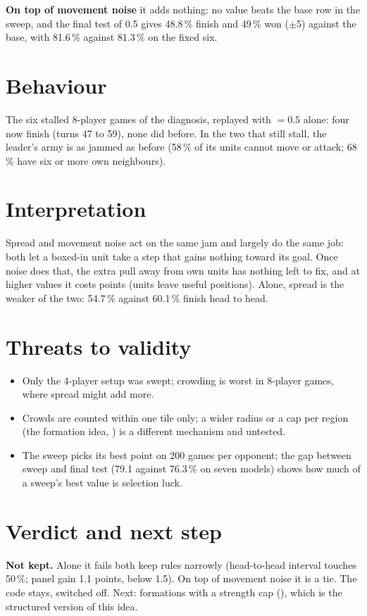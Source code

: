 \documentclass{../polyexp}
\begin{document}
\textbf{On top of movement noise} it adds nothing: no value beats the base row in the sweep, and the final test of 0.5 gives 48.8\,\% finish and 49\,\% won ($\pm$5) against the base, with 81.6\,\% against 81.3\,\% on the fixed six.

\section{Behaviour}
The six stalled 8-player games of the diagnosis, replayed with  $=0.5$ alone: four now finish (turns 47 to 59), none did before. In the two that still stall, the leader's army is as jammed as before (58\,\% of its units cannot move or attack; 68\,\% have six or more own neighbours).


\section{Interpretation}
Spread and movement noise act on the same jam and largely do the same job: both let a boxed-in unit take a step that gains nothing toward its goal. Once noise does that, the extra pull away from own units has nothing left to fix, and at higher values it costs points (units leave useful positions). Alone, spread is the weaker of the two: 54.7\,\% against 60.1\,\% finish head to head.


\section{Threats to validity}
\begin{itemize}
\item Only the 4-player setup was swept; crowding is worst in 8-player games, where spread might add more.
\item Crowds are counted within one tile only; a wider radius or a cap per region (the formation idea, ) is a different mechanism and untested.
\item The sweep picks its best point on 200 games per opponent; the gap between sweep and final test (79.1 against 76.3\,\% on seven models) shows how much of a sweep's best value is selection luck.
\end{itemize}

\section{Verdict and next step}
\textbf{Not kept.} Alone it fails both keep rules narrowly (head-to-head interval touches 50\,\%; panel gain 1.1 points, below 1.5). On top of movement noise it is a tie. The code stays, switched off. Next: formations with a strength cap (), which is the structured version of this idea.
\end{document}
